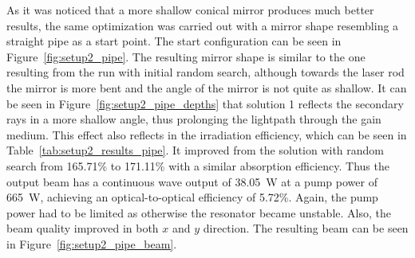 \documentclass[a4paper,10pt]{article}
\newcommand{\figref}[1]{Figure~\ref{#1}}
\newcommand{\tabref}[1]{Table~\ref{#1}}
\begin{document}
    As it was noticed that a more shallow conical mirror produces much
    better results, the same optimization was carried out with a mirror
    shape resembling a straight pipe as a start point.
    The start configuration can be seen in \figref{fig:setup2_pipe}.
    The resulting mirror shape is similar to the one resulting from the run
    with initial random search, although towards the laser rod the mirror is
    more bent and the angle of the mirror is not quite as shallow.
    It can be seen in \figref{fig:setup2_pipe_depths} that solution 1
    reflects the secondary rays in a more shallow angle, thus prolonging
    the lightpath through the gain medium.
    This effect also reflects in the irradiation efficiency, which
    can be seen in \tabref{tab:setup2_results_pipe}.
    It improved from the solution with random search from 165.71\% to
    171.11\% with a similar absorption efficiency.
    Thus the output beam has a continuous wave output of
    \SI{38.05}{W} at a pump power of \SI{665}{W}, achieving an 
    optical-to-optical efficiency of 5.72\%.
    Again, the pump power had to be limited as otherwise the resonator
    became unstable.
    Also, the beam quality improved in both $x$ and $y$ direction.
    The resulting beam can be seen in \figref{fig:setup2_pipe_beam}.    
\end{document}
